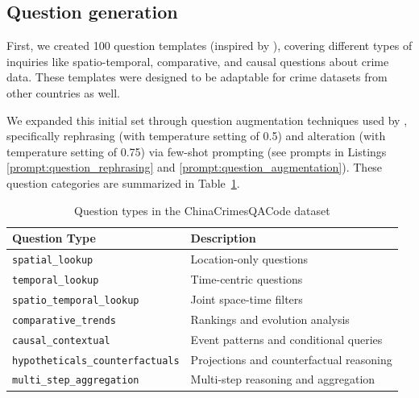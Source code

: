 \subsection{Question generation}

First, we created 100 question templates (inspired by \citep{Dai2024QASTKG, Contractor2020QATourism}), covering different types of inquiries like spatio-temporal, comparative, and causal questions about crime data. These templates were designed to be adaptable for crime datasets from other countries as well.

We expanded this initial set through question augmentation techniques used by \cite{Yin2024MuMathCode, Li2024MuggleMath, Jain2024MetaFineTuning}, specifically rephrasing (with temperature setting of 0.5) and alteration (with temperature setting of 0.75) via few-shot prompting (see prompts in Listings \ref{prompt:question_rephrasing} and \ref{prompt:question_augmentation}). These question categories are summarized in Table~\ref{tab:question_types}. %


\begin{table}[H]
\centering
\footnotesize
\small
\begin{tabular}{ll}
  \toprule
\textbf{Question Type} & \textbf{Description} \\
\midrule
\texttt{spatial\_lookup} & Location-only questions \\
\texttt{temporal\_lookup} & Time-centric questions \\
\texttt{spatio\_temporal\_lookup} & Joint space-time filters \\
\texttt{comparative\_trends} & Rankings and evolution analysis \\
\texttt{causal\_contextual} & Event patterns and conditional queries \\
\texttt{hypotheticals\_counterfactuals} & Projections and counterfactual reasoning \\
\texttt{multi\_step\_aggregation} & Multi-step reasoning and aggregation \\
\bottomrule
\end{tabular}
\caption{Question types in the ChinaCrimesQACode dataset}
\label{tab:question_types}
\end{table}


